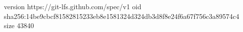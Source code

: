 version https://git-lfs.github.com/spec/v1
oid sha256:14be9cbcf81582815233eb8e1581324d324db3d8f8e24f6a67f756c3a89574c4
size 43840
